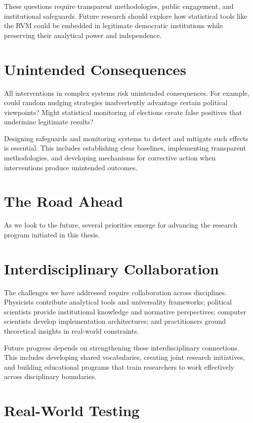 These questions require transparent methodologies, public engagement, and institutional safeguards. Future research should explore how statistical tools like the RVM could be embedded in legitimate democratic institutions while preserving their analytical power and independence.

\section{Unintended Consequences}

All interventions in complex systems risk unintended consequences. For example, could random nudging strategies inadvertently advantage certain political viewpoints? Might statistical monitoring of elections create false positives that undermine legitimate results?

Designing safeguards and monitoring systems to detect and mitigate such effects is essential. This includes establishing clear baselines, implementing transparent methodologies, and developing mechanisms for corrective action when interventions produce unintended outcomes.

\section{The Road Ahead}

As we look to the future, several priorities emerge for advancing the research program initiated in this thesis.

\section{Interdisciplinary Collaboration}

The challenges we have addressed require collaboration across disciplines. Physicists contribute analytical tools and universality frameworks; political scientists provide institutional knowledge and normative perspectives; computer scientists develop implementation architectures; and practitioners ground theoretical insights in real-world constraints.

Future progress depends on strengthening these interdisciplinary connections. This includes developing shared vocabularies, creating joint research initiatives, and building educational programs that train researchers to work effectively across disciplinary boundaries.

\section{Real-World Testing}

